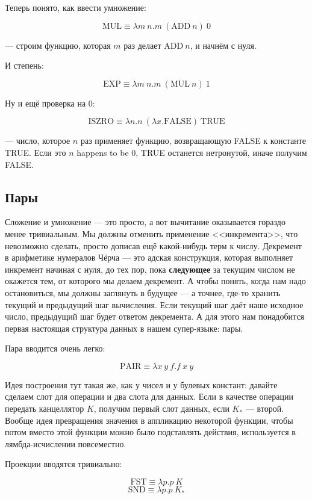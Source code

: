 \documentclass{../../text-style}
\begin{document}
Теперь понято, как ввести умножение:

$$\mbox{MUL} \equiv \lambda m\ n.m\ (\mbox{ADD}\ n)\ 0$$

--- строим функцию, которая $m$ раз делает $\mbox{ADD}\ n$, и начнём с нуля.

И степень:

$$\mbox{EXP} \equiv \lambda m\ n.m\ (\mbox{MUL}\ n)\ 1$$

Ну и ещё проверка на 0:

$$\mbox{ISZRO} \equiv \lambda n.n\ (\lambda x.\mbox{FALSE})\ \mbox{TRUE}$$

--- число, которое $n$ раз применяет функцию, возвращающую FALSE к константе TRUE. Если это $n$ happens to be 0, TRUE останется нетронутой, иначе получим FALSE.

\subsection{Пары}

Сложение и умножение --- это просто, а вот вычитание оказывается гораздо менее тривиальным. Мы должны отменить применение <<инкремента>>, что невозможно сделать, просто дописав ещё какой-нибудь терм к числу. Декремент в арифметике нумералов Чёрча --- это адская конструкция, которая выполняет инкремент начиная с нуля, до тех пор, пока \textbf{следующее} за текущим числом не окажется тем, от которого мы делаем декремент. А чтобы понять, когда нам надо остановиться, мы должны заглянуть в будущее --- а точнее, где-то хранить текущий и предыдущий шаг вычисления. Если текущий шаг даёт наше исходное число, предыдущий шаг будет ответом декремента. А для этого нам понадобится первая настоящая структура данных в нашем супер-языке: пары.

Пара вводится очень легко: 

$$\mbox{PAIR} \equiv \lambda x\ y\ f.f\ x\ y$$

Идея построения тут такая же, как у чисел и у булевых констант: давайте сделаем слот для операции и два слота для данных. Если в качестве операции передать канцеллятор $K$, получим первый слот данных, если $K_\ast$ --- второй. Вообще идея превращения значения в аппликацию некоторой функции, чтобы потом вместо этой функции можно было подставлять действия,  используется в лямбда-исчислении повсеместно.

Проекции вводятся тривиально:

$$\mbox{FST} \equiv \lambda p.p\ K$$
$$\mbox{SND} \equiv \lambda p.p\ K_\ast$$
\end{document}
